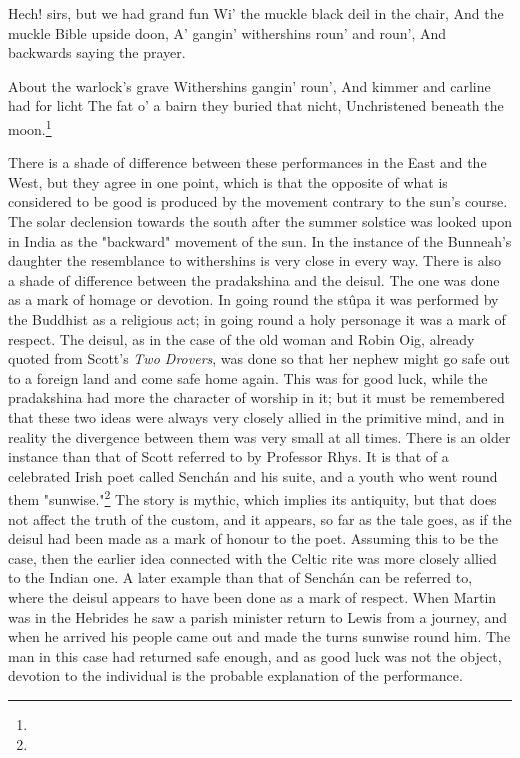 \documentclass[a4paper, 11pt, oneside, polutonikogreek, english]{article}
\begin{document}
Hech! sirs, but we had grand fun  
Wi' the muckle black deil in the chair,  
And the muckle Bible upside doon,  
A' gangin' withershins roun' and roun',  
And backwards saying the prayer.

About the warlock's grave  
Withershins gangin' roun',  
And kimmer and carline had for licht  
The fat o' a bairn they buried that nicht,  
Unchristened beneath the moon.\footnote{}

There is a shade of difference between these performances in the East and the West, but they agree in one point, which is that the opposite of what is considered to be good is produced by the movement contrary to the sun's course. The solar declension towards the south after the summer solstice was looked upon in India as the "backward" movement of the sun. In the instance of the Bunneah's daughter the resemblance to withershins is very close in every way. There is also a shade of difference between the pradakshina and the deisul. The one was done as a mark of homage or devotion. In going round the stûpa it was performed by the Buddhist as a religious act; in going round a holy personage it was a mark of respect. The deisul, as in the case of the old woman and Robin Oig, already quoted from Scott's \emph{Two Drovers}, was done so that her nephew might go safe out to a foreign land and come safe home again. This was for good luck, while the pradakshina had more the character of worship in it; but it must be remembered that these two ideas were always very closely allied in the primitive mind, and in reality the divergence between them was very small at all times. There is an older instance than that of Scott referred to by Professor Rhys. It is that of a celebrated Irish poet called Senchán and his suite, and a youth who went round them "sunwise."\footnote{} The story is mythic, which implies its antiquity, but that does not affect the truth of the custom, and it appears, so far as the tale goes, as if the deisul had been made as a mark of honour to the poet. Assuming this to be the case, then the earlier idea connected with the Celtic rite was more closely allied to the Indian one. A later example than that of Senchán can be referred to, where the deisul appears to have been done as a mark of respect. When Martin was in the Hebrides he saw a parish minister return to Lewis from a journey, and when he arrived his people came out and made the turns sunwise round him. The man in this case had returned safe enough, and as good luck was not the object, devotion to the individual is the probable explanation of the performance.
\end{document}
